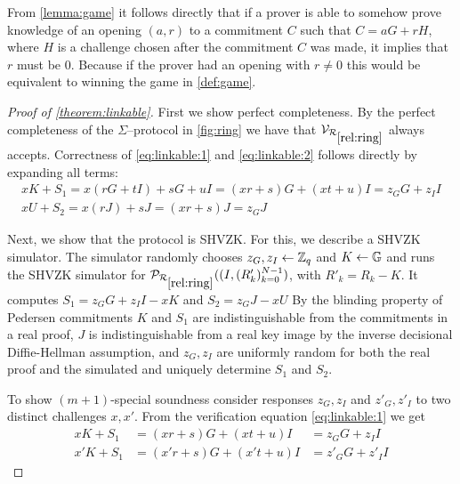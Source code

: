 \begin{corollary}\label{corollary:game}
	From \cref{lemma:game} it follows directly that if a prover is able to somehow prove knowledge of an opening $(a, r)$ to a commitment $C$ such that $C = aG + rH$, where $H$ is a challenge chosen after the commitment $C$ was made, it implies that $r$ must be $0$.
	Because if the prover had an opening with $r \ne 0$ this would be equivalent to winning the game in \cref{def:game}.
\end{corollary}

\begin{proof}[Proof of \cref{theorem:linkable}]
	First we show perfect completeness.
	By the perfect completeness of the $\Sigma$--protocol in \cref{fig:ring} we have that $\V_{\Rref{rel:ring}}$ always accepts.
	Correctness of \cref{eq:linkable:1} and \cref{eq:linkable:2} follows directly by expanding all terms:
	$$\begin{matrix}
	xK + S_1 = x(rG + tI) + sG + uI = (xr + s)G + (xt + u)I = z_G G + z_I I \\
	xU + S_2 = x(rJ) + sJ = (xr + s)J = z_G J
	\end{matrix}$$

	Next, we show that the protocol is \ac{SHVZK}.
	For this, we describe a \ac{SHVZK} simulator.
	The simulator randomly chooses $z_G, z_I \leftarrow \mathbb Z_q$ and $K \leftarrow \mathbb G$ and runs the \ac{SHVZK} simulator for $\P_{\Rref{rel:ring}}((I, (R'_k)_{k=0}^{N-1})$, with $R'_k = R_k - K$.
	It computes $S_1 = z_G G + z_I I - xK$ and $S_2 = z_G J - xU$
	By the blinding property of Pedersen commitments $K$ and $S_1$ are indistinguishable from the commitments in a real proof, $J$ is indistinguishable from a real key image by the inverse decisional Diffie-Hellman assumption, and $z_G, z_I$ are uniformly random for both the real proof and the simulated and uniquely determine $S_1$ and $S_2$.

	To show $(m+1)$-special soundness consider responses $z_G, z_I$ and $z'_G, z'_I$ to two distinct challenges $x, x'$.
	From the verification equation \cref{eq:linkable:1} we get
	$$\begin{aligned}
	x K + S_1 &= (x r + s)G + (x t + u)I &= z _G G + z _I I \\
	x'K + S_1 &= (x'r + s)G + (x't + u)I &= z'_G G + z'_I I
	\end{aligned}$$


\end{proof}
